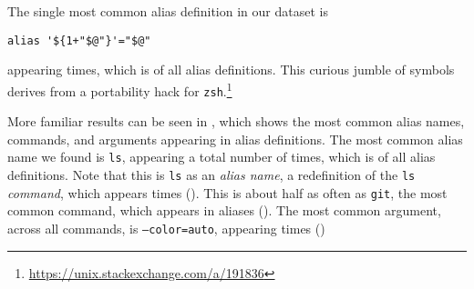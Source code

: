 The single most common alias definition in our dataset is
\begin{verbatim}
alias '${1+"$@"}'="$@"
\end{verbatim}
appearing  times, which is  of all alias definitions.
This curious jumble of symbols derives from a portability hack for \texttt{zsh}.\footnote{\url{https://unix.stackexchange.com/a/191836}}

More familiar results can be seen in , which shows the most common alias names, commands, and arguments appearing in alias definitions.
The most common alias name we found is \texttt{ls}, appearing a total number of  times, which is  of all alias definitions.
Note that this is \texttt{ls} as an \emph{alias name}, a redefinition of the \texttt{ls} \emph{command}, which appears  times ().
This is about half as often as \texttt{git}, the most common command, which appears in  aliases ().
The most common argument, across all commands, is \texttt{--color=auto}, appearing  times ()

